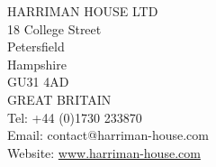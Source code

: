 \clearpage \begin{titlepage} \thispagestyle{empty} \begin{center} \vspace*{0.17\textheight} { \par } \vspace{0.42em} {\booksans\normalsize\bfseries{} \par } \vspace{1.65cm} {\bookdisplayfont\Huge\bfseries{} \par } \vspace{0.45em}
{\Large\bfseries{}\par}
\vspace{1.3cm} \begin{minipage}{0.72\textwidth} \centering
{\Large{}\par}
\vspace{0.45em}
{\large{}\par}
\end{minipage}
\vspace{1.5em} \bookornament \vspace{2.0cm}
{\Large{}\par}
\vspace{0.5em}
{\large{}\par}
\end{center}
\vfill \end{titlepage}
\thispagestyle{empty} \begingroup \scriptsize \setlength{\parindent}{0pt} \textwidth {}\textwidth \raggedright \vspace*{0.07\textheight} { \par } \vspace{0.35em} {{\booksans\small\bfseries{} \par }} \vspace{0.65em} \bookminorornament \vspace{0.9em} \begin{englishblock} HARRIMAN HOUSE LTD\\
18 College Street\\
Petersfield\\
Hampshire\\
GU31 4AD\\
GREAT BRITAIN\\
Tel: +44 (0)1730 233870\\
Email: contact@harriman-house.com\\
Website: \url{www.harriman-house.com} \par \end{englishblock}

